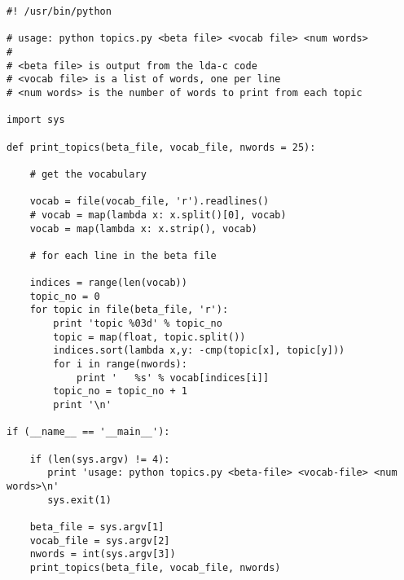 \begin{lstlisting}
#! /usr/bin/python

# usage: python topics.py <beta file> <vocab file> <num words>
#
# <beta file> is output from the lda-c code
# <vocab file> is a list of words, one per line
# <num words> is the number of words to print from each topic

import sys

def print_topics(beta_file, vocab_file, nwords = 25):

    # get the vocabulary

    vocab = file(vocab_file, 'r').readlines()
    # vocab = map(lambda x: x.split()[0], vocab)
    vocab = map(lambda x: x.strip(), vocab)

    # for each line in the beta file

    indices = range(len(vocab))
    topic_no = 0
    for topic in file(beta_file, 'r'):
        print 'topic %03d' % topic_no
        topic = map(float, topic.split())
        indices.sort(lambda x,y: -cmp(topic[x], topic[y]))
        for i in range(nwords):
            print '   %s' % vocab[indices[i]]
        topic_no = topic_no + 1
        print '\n'

if (__name__ == '__main__'):

    if (len(sys.argv) != 4):
       print 'usage: python topics.py <beta-file> <vocab-file> <num words>\n'
       sys.exit(1)

    beta_file = sys.argv[1]
    vocab_file = sys.argv[2]
    nwords = int(sys.argv[3])
    print_topics(beta_file, vocab_file, nwords)
\end{lstlisting}

